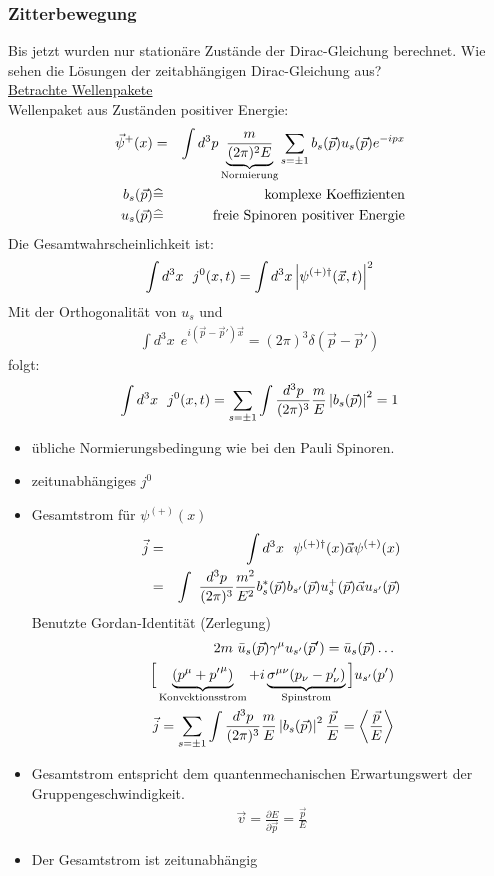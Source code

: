 \subsubsection{Zitterbewegung} 
Bis jetzt wurden nur stationäre Zustände der Dirac-Gleichung berechnet. Wie sehen die Lösungen der zeitabhängigen Dirac-Gleichung aus?\\
\underline{Betrachte Wellenpakete}\\
Wellenpaket aus Zuständen positiver Energie:
\begin{eqnarray*}
\vec \psi^+ (x) &=& \int d^3 p \underbrace{\frac m {(2\pi)^2 E}}_{\text{Normierung}} \sum \limits_{s = \pm 1} b_s(\vec p) u_s(\vec p)e^{-i p x}\\
b_s(\vec p) &\widehat = &\quad\text{komplexe Koeffizienten}\\
u_s(\vec p) &\widehat = &\quad \text{freie Spinoren positiver Energie}
\end{eqnarray*}
Die Gesamtwahrscheinlichkeit ist:
\begin{eqnarray*}
\int d^3x \ \ j^0(x,t)= \int d^3x\left|\psi^{(+){\dagger}}(\vec x, t)\right|^2\\
\end{eqnarray*}
Mit der Orthogonalität von $u_s$ und 
\begin{eqnarray*}
\int d^3 x \ \ e^{i(\vec p-\vec p')\vec x} = (2\pi)^3 \delta(\vec p-\vec p ')
\end{eqnarray*}
folgt:
\begin{eqnarray*}
\int d^3x \ \ j^0(x,t)= \sum\limits_{s = \pm 1} \int \frac{d^3p}{(2\pi)^3} \frac m E \left|b_s(\vec p)\right |^2 = 1
\end{eqnarray*}
\begin{itemize}
\item  übliche Normierungsbedingung wie bei den Pauli Spinoren.
\item zeitunabhängiges $j^0$
\item Gesamtstrom für $\psi^{(+)}(x)$
\begin{eqnarray*} \vec j &=& \int d^3x \ \ \psi^{(+)\dagger}(x)\vec  \alpha\psi^{(+)}(x)\\
&=& \int \ \frac{d^3p}{(2\pi)^3}\frac{m^2}{E^2} b_s^*(\vec p)b_{s'}(\vec p)u^+_s(\vec p)\vec \alpha u_{s'}(\vec p)
\end{eqnarray*}
Benutzte Gordan-Identität (Zerlegung)
\begin{eqnarray*} 2 m \ \bar u_s(\vec p) \gamma^\mu u_{s'}(\vec p') = \bar u_s (\vec p)\dots\\
\Big[ \underbrace{(p ^\mu+ {p'}^{\mu})}_{\text{Konvektionsstrom}} + i \underbrace{\sigma^{\mu\nu}(p_\nu-p'_\nu)}_{\text{Spinstrom}}\Big] u_{s'}(p')\\
\vec j = \sum \limits_{s = \pm 1} \int \frac{d^3 p}{(2 \pi)^3} \frac m E \left |b_s(\vec p)\right|^2 \frac{\vec p}E = \left < \frac{\vec p}E\right >
\end{eqnarray*}
\item Gesamtstrom entspricht dem quantenmechanischen Erwartungswert der Gruppengeschwindigkeit.
\begin{eqnarray*} \vec v = \frac{\partial E} {\partial \vec p} = \frac{\vec p}E\end{eqnarray*}
\item Der Gesamtstrom ist zeitunabhängig
\end{itemize}
